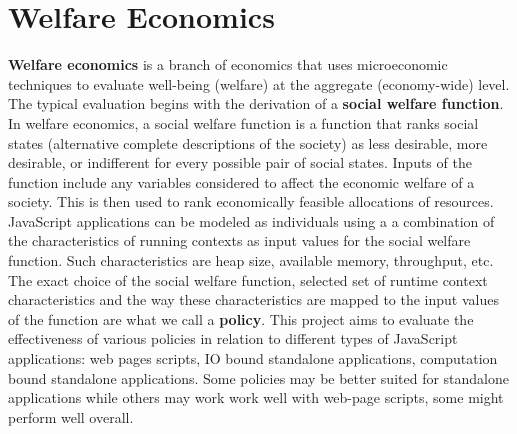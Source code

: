 \documentclass{l4proj}
\begin{document}
\section{Welfare Economics}
\hspace*{3em} \textbf{Welfare economics} is a branch of economics that uses microeconomic techniques to evaluate well-being (welfare) at the aggregate (economy-wide) level.\cite{welfareeconomics} The typical evaluation begins with the derivation of a \textbf{social welfare function}. In welfare economics, a social welfare function is a function that ranks social states (alternative complete descriptions of the society) as less desirable, more desirable, or indifferent for every possible pair of social states. Inputs of the function include any variables considered to affect the economic welfare of a society.\cite{socialwelfarefunction} This is then used to rank economically feasible allocations of resources. JavaScript applications can be modeled as individuals using a a combination of the characteristics of running contexts as input values for the social welfare function. Such characteristics are heap size, available memory, throughput, etc. The exact choice of the social welfare function, selected set of runtime context characteristics and the way these characteristics are mapped to the input values of the function are what we call a \textbf{policy}. This project aims to evaluate the effectiveness of various policies in relation to different types of JavaScript applications: web pages scripts, IO bound standalone applications, computation bound standalone applications. Some policies may be better suited for standalone applications while others may work work well with web-page scripts, some might perform well overall. 
\end{document}
